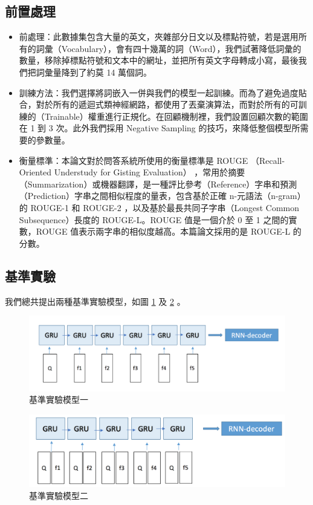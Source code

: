 \subsection{前置處理}
\itemsep -4pt
\begin{itemize}
    \item 前處理：此數據集包含大量的英文，夾雜部分日文以及標點符號，若是選用所有的詞彙（Vocabulary），會有四十幾萬的詞（Word），我們試著降低詞彙的數量，移除掉標點符號和文本中的網址，並把所有英文字母轉成小寫，最後我們把詞彙量降到了約莫 14 萬個詞。
    \item 訓練方法：我們選擇將詞嵌入一併與我們的模型一起訓練。而為了避免過度貼合，對於所有的遞迴式類神經網路，都使用了丟棄演算法，而對於所有的可訓練的（Trainable）權重進行正規化。在回顧機制裡，我們設置回顧次數的範圍在 1 到 3 次。此外我們採用 Negative Sampling 的技巧，來降低整個模型所需要的參數量。
    \item 衡量標準：本論文對於問答系統所使用的衡量標準是 ROUGE （Recall-Oriented Understudy for Gisting Evaluation）\cite{lin2004rouge} ，常用於摘要（Summarization）或機器翻譯，是一種評比參考（Reference）字串和預測（Prediction）字串之間相似程度的量表，包含基於正確 n-元語法（n-gram）的 ROUGE-1 和 ROUGE-2 ，以及基於最長共同子字串（Longest Common Subsequence）長度的 ROUGE-L。ROUGE 值是一個介於 0 至 1 之間的實數，ROUGE 值表示兩字串的相似度越高。本篇論文採用的是 ROUGE-L 的分數。

\end{itemize}
\subsection{基準實驗}
我們總共提出兩種基準實驗模型，如圖 \ref{fig:baseline1} 及 \ref{fig:baseline2} 。
\begin{figure}[h]
    \centering
    \includegraphics[scale=0.54]{images/chap3_baseline1.png}
    \caption{基準實驗模型一}\label{fig:baseline1}
\end{figure}
\begin{figure}[h]
    \centering
    \includegraphics[scale=0.54]{images/chap3_baseline2.png}
    \caption{基準實驗模型二}\label{fig:baseline2}
\end{figure}

